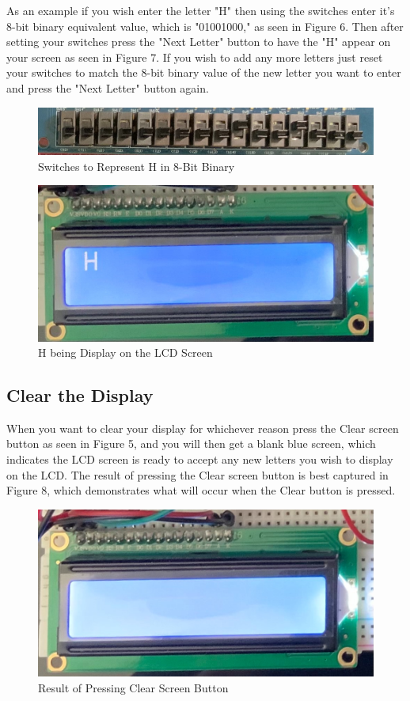 \documentclass{article}
\begin{document}
As an example if you wish enter the letter "H" then using the switches enter it's 8-bit binary equivalent value,
which is "01001000," as seen in Figure 6. Then after setting your switches press the "Next Letter" button to
have the "H" appear on your screen as seen in Figure 7. If you wish to add any more letters just reset your 
switches to match the 8-bit binary value of the new letter you want to enter and press the "Next Letter" 
button again.

\begin{figure} [ht!]
\centering
\includegraphics[width=0.7\linewidth]{HBinary.jpg}
  \caption{Switches to Represent H in 8-Bit Binary}
  \label{fig:fig6}
\end{figure}

\begin{figure} [ht!]
\centering
\includegraphics[width=0.7\linewidth]{H.jpg}
  \caption{H being Display on the LCD Screen}
  \label{fig:fig7}
\end{figure}

\subsection{Clear the Display}

When you want to clear your display for whichever reason press the Clear screen button as seen in Figure 5, and you 
will then get a blank blue screen, which indicates the LCD screen is ready to accept any new letters 
you wish to display on the LCD. The result of pressing the Clear screen button is best captured in Figure 8, which 
demonstrates what will occur when the Clear button is pressed.

\begin{figure} [ht!]
\centering
\includegraphics[width=0.7\linewidth]{Clear.jpg}
  \caption{Result of Pressing Clear Screen Button}
  \label{fig:fig8}
\end{figure}
\end{document}
